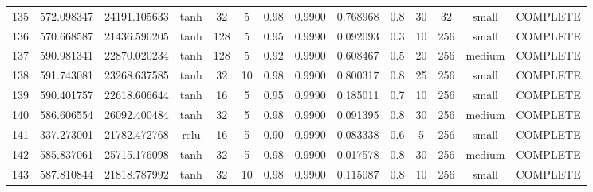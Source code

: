 \begin{longtable}{cccccccccccccc}
                      135 &                 572.098347 &                       24191.105633 &            tanh &          32 &              5 &        0.98 & 0.9900 &       0.768968 &             0.8 &                 30 &       32 &     small & COMPLETE \\
                      136 &                 570.668587 &                       21436.590205 &            tanh &         128 &              5 &        0.95 & 0.9990 &       0.092093 &             0.3 &                 10 &      256 &     small & COMPLETE \\
                      137 &                 590.981341 &                       22870.020234 &            tanh &         128 &              5 &        0.92 & 0.9900 &       0.608467 &             0.5 &                 20 &      256 &    medium & COMPLETE \\
                      138 &                 591.743081 &                       23268.637585 &            tanh &          32 &             10 &        0.98 & 0.9900 &       0.800317 &             0.8 &                 25 &      256 &     small & COMPLETE \\
                      139 &                 590.401757 &                       22618.606644 &            tanh &          16 &              5 &        0.95 & 0.9990 &       0.185011 &             0.7 &                 10 &      256 &     small & COMPLETE \\
                      140 &                 586.606554 &                       26092.400484 &            tanh &          32 &              5 &        0.98 & 0.9900 &       0.091395 &             0.8 &                 30 &      256 &    medium & COMPLETE \\
                      141 &                 337.273001 &                       21782.472768 &            relu &          16 &              5 &        0.90 & 0.9990 &       0.083338 &             0.6 &                  5 &      256 &     small & COMPLETE \\
                      142 &                 585.837061 &                       25715.176098 &            tanh &          32 &              5 &        0.98 & 0.9900 &       0.017578 &             0.8 &                 30 &      256 &    medium & COMPLETE \\
                      143 &                 587.810844 &                       21818.787992 &            tanh &          32 &             10 &        0.98 & 0.9900 &       0.115087 &             0.8 &                 10 &      256 &     small & COMPLETE \\

\end{longtable}
